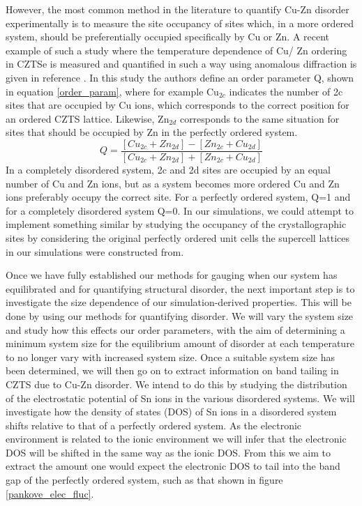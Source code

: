 However, the most common method in the literature to quantify Cu-Zn disorder experimentally is to measure the site occupancy of sites which, in a more ordered system, should be preferentially occupied specifically by Cu or Zn. A recent example of such a study where the temperature dependence of Cu/ Zn ordering in CZTSe is measured and quantified in such a way using anomalous diffraction is given in reference . In this study the authors define an order parameter Q, shown in equation \ref{order_param}, where for example Cu$_{2c}$ indicates the number of 2c sites that are occupied by Cu ions, which corresponds to the correct position for an ordered CZTS lattice. Likewise, Zn$_{2d}$ corresponds to the same situation for sites that should be occupied by Zn in the perfectly ordered system.
\begin{equation} \label{order_param}
Q = \frac{[Cu_{2c} + Zn_{2d}] - [Zn_{2c} + Cu_{2d}]}{[Cu_{2c} + Zn_{2d}] + [Zn_{2c} + Cu_{2d}]}
\end{equation}
In a completely disordered system, 2c and 2d sites are occupied by an equal number of Cu and Zn ions, but as a system becomes more ordered Cu and Zn ions preferably occupy the correct site. For a perfectly ordered system, Q=1 and for a completely disordered system Q=0. In our simulations, we could attempt to implement something similar by studying the occupancy of the crystallographic sites by considering the original perfectly ordered unit cells the supercell lattices in our simulations were constructed from.

Once we have fully established our methods for gauging when our system has equilibrated and for quantifying structural disorder, the next important step is to investigate the size dependence of our simulation-derived properties. This will be done by using our methods for quantifying disorder. We will vary the system size and study how this effects our order parameters, with the aim of determining a minimum system size for the equilibrium amount of disorder at each temperature to no longer vary with increased system size. Once a suitable system size has been determined, we will then go on to extract information on band tailing in CZTS due to Cu-Zn disorder. We intend to do this by studying the distribution of the electrostatic potential of Sn ions in the various disordered systems. We will investigate how the density of states (DOS) of Sn ions in a disordered system shifts relative to that of a perfectly ordered system. As the electronic environment is related to the ionic environment we will infer that the electronic DOS will be shifted in the same way as the ionic DOS. From this we aim to extract the amount one would expect the electronic DOS to tail into the band gap of the perfectly ordered system, such as that shown in figure \ref{pankove_elec_fluc}.


